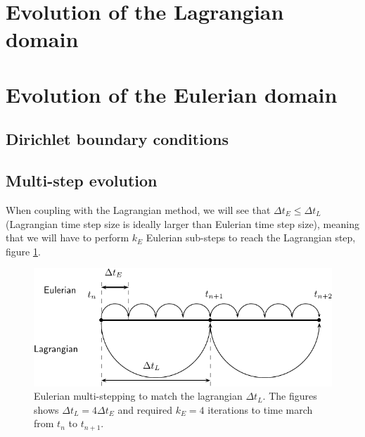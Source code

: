 \section{Evolution of the Lagrangian domain}

\section{Evolution of the Eulerian domain}

\subsection{Dirichlet boundary conditions}

\subsection{Multi-step evolution}

When coupling with the Lagrangian method, we will see that $\Delta t_E \leqslant \Delta t_L$ (Lagrangian time step size is ideally larger than Eulerian time step size), meaning that we will have to perform $k_E$ Eulerian sub-steps to reach the Lagrangian step, figure \ref{fig:multiStep}.

	\begin{figure}[t]
	\centering
	\includegraphics[width=0.7\linewidth]{./figures/eulerian/multiStep-crop.pdf}
	\caption{Eulerian multi-stepping to match the lagrangian $\Delta t_L$. The figures shows $\Delta t_L = 4 \Delta t_E$ and required $k_E = 4$ iterations to time march from $t_n$ to $t_{n+1}$.}
	\label{fig:multiStep}
	\end{figure}	




%	




